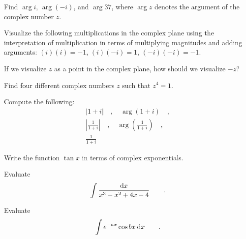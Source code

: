 \begin{hwsection}

\begin{hw}
Find $\arg i$, $\arg(-i)$, and $\arg 37$, where $\arg z$ denotes the argument of the complex number $z$.
\end{hw}

\begin{hw}
Visualize the following multiplications in the complex plane using the interpretation of multiplication
in terms of multiplying magnitudes and adding arguments: $(i)(i)=-1$, $(i)(-i)=1$, $(-i)(-i)=-1$.
\end{hw}

\begin{hw}
If we visualize $z$ as a point in the complex plane, how should we visualize $-z$?
\end{hw}

\begin{hw}
Find four different complex numbers $z$ such that $z^4=1$.
\end{hw}

\begin{hw}
Compute the following: 
\begin{gather*}
|1+i| \quad , \quad \arg(1+i) \quad , \\
  \left|\frac{1}{1+i}\right| \quad , \quad \arg\left(\frac{1}{1+i}\right) \quad , \\
  \frac{1}{1+i}
\end{gather*}
\end{hw}

\begin{hw}
Write the function $\tan x$ in terms of complex exponentials.
\end{hw}

\begin{hw}
Evaluate
\begin{equation*}
  \int \frac{\textup{d} x}{x^3-x^2+4x-4} \qquad .
\end{equation*}
\end{hw}

\begin{hw}
Evaluate
\begin{equation*}
  \int e^{-ax}\cos bx \: \textup{d} x \qquad .
\end{equation*}
\end{hw}

\end{hwsection}
